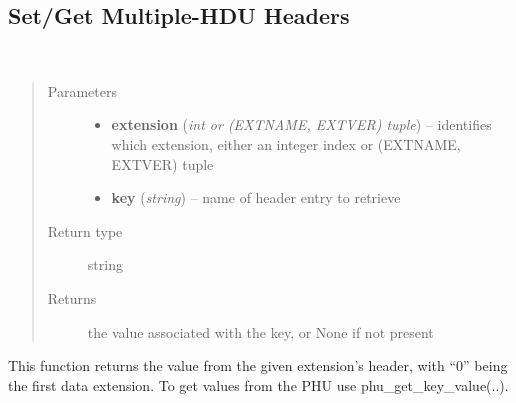 \documentclass[letterpaper,10pt,english]{sphinxmanual}
\begin{document}
\subsection{Set/Get Multiple-HDU Headers}
\label{chapter_AstroDataClass:set-get-multiple-hdu-headers}

\begin{fulllineitems}
\label{chapter_AstroDataClass:astrodata.data.AstroData.ext_get_key_value}~\begin{quote}\begin{description}
\item[{Parameters}] \leavevmode\begin{itemize}
\item {} 
\textbf{extension} (\emph{int or (EXTNAME, EXTVER) tuple}) -- identifies which extension, either an integer index 
or (EXTNAME, EXTVER) tuple

\item {} 
\textbf{key} (\emph{string}) -- name of header entry to retrieve

\end{itemize}

\item[{Return type}] \leavevmode
string

\item[{Returns}] \leavevmode
the value associated with the key, or None if not present

\end{description}\end{quote}

This function returns the value from the given extension's
header, with ``0'' being the first data extension.  To get
values from the PHU use phu\_get\_key\_value(..).

\end{fulllineitems}

\end{document}
